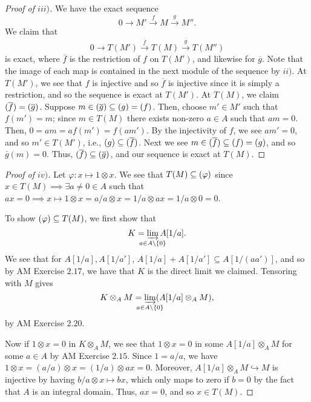 \documentclass[12pt,letterpaper]{article}
\theoremstyle{definition}
\theoremstyle{remark}
\numberwithin{figure}{problem}
\numberwithin{equation}{section}
\let\Im\relax
\DeclareMathOperator{\Im}{Im}
\let\ker\relax
\DeclareMathOperator{\ker}{Ker}
\begin{document}
\begin{proof}[Proof of $iii)$]
  We have the exact sequence
  \begin{equation*}
    0 \to M' \xrightarrow{f} M \xrightarrow{g} M''.
  \end{equation*}
  We claim that
  \begin{equation*}
    0 \to T(M') \xrightarrow{\overline{f}} T(M) \xrightarrow{\overline{g}} T(M'')
  \end{equation*}
  is exact, where $\overline{f}$ is the restriction of $f$ on $T(M')$, and likewise for $\overline{g}$. Note that the image of each map is contained in the next module of the sequence by $ii)$. At $T(M')$, we see that $f$ is injective and so $\overline{f}$ is injective since it is simply a restriction, and so the sequence is exact at $T(M')$. At $T(M)$, we claim $\Im(\overline{f}) = \ker(\overline{g})$. Suppose $m \in \ker(\overline{g}) \subseteq \ker(g) = \Im(f)$. Then, choose $m' \in M'$ such that $f(m') = m$; since $m \in T(M)$ there exists non-zero $a \in A$ such that $am = 0$. Then, $0 = am = af(m') = f(am')$. By the injectivity of $f$, we see $am' = 0$, and so $m' \in T(M')$, i.e., $\ker({g}) \subseteq \Im(\overline{f})$. Next we see $m \in \Im(\overline{f}) \subseteq \Im(f) = \ker(g)$, and so $\overline{g}(m) = 0$. Thus, $\Im(\overline{f}) \subseteq \ker(\overline{g})$, and our sequence is exact at $T(M)$.
\end{proof}
\begin{proof}[Proof of $iv)$]
  Let $\varphi: x \mapsto 1 \otimes x$. We see that $T(M) \subseteq \ker(\varphi)$ since $x \in T(M) \implies \exists a \ne 0 \in A$ such that $ax = 0 \implies x \mapsto 1 \otimes x = a/a \otimes x = 1/a \otimes ax = 1/a \otimes 0 = 0$.
  \par To show $\ker(\varphi) \subseteq T(M)$, we first show that
  \begin{equation*}
    K = \varinjlim_{\mathclap{a \in A \setminus \{0\}}} A[1/a].
  \end{equation*}
  We see that for $A[1/a], A[1/a']$, $A[1/a] + A[1/a'] \subseteq A[1/(aa')]$, and so by AM Exercise $2.17$, we have that $K$ is the direct limit we claimed. Tensoring with $M$ gives
  \begin{equation*}
    K \otimes_A M = \varinjlim_{\mathclap{a \in A \setminus \{0\}}} (A[1/a] \otimes_A M),
  \end{equation*}
  by AM Exercise $2.20$. 
  \par Now if $1 \otimes x = 0$ in $K \otimes_A M$, we see that $1 \otimes x = 0$ in some $A[1/a] \otimes_A M$ for some $a \in A$ by AM Exercise $2.15$. Since $1 = a/a$, we have $1 \otimes x = (a/a) \otimes x = (1/a) \otimes ax = 0$. Moreover, $A[1/a] \otimes_A M \hookrightarrow M$ is injective by having $b/a \otimes x \mapsto bx$, which only maps to zero if $b = 0$ by the fact that $A$ is an integral domain. Thus, $ax = 0$, and so $x \in T(M)$.
\end{proof}
\end{document}
